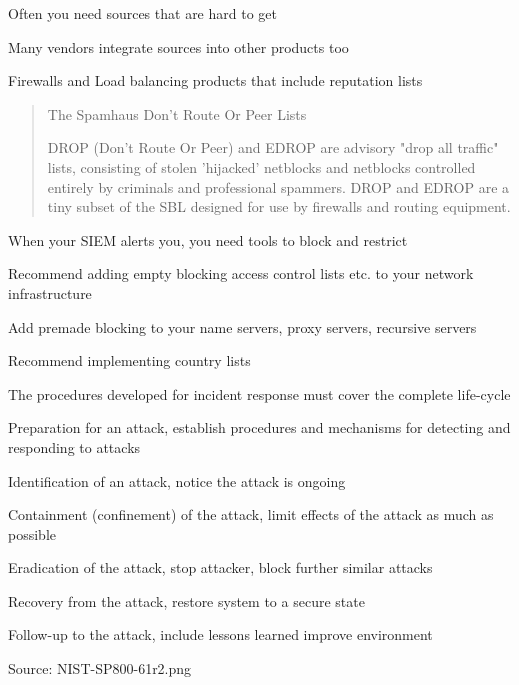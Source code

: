 \documentclass[Screen16to9,17pt]{foils}
\begin{document}
\begin{list2}
\item Often you need sources that are hard to get
\item Many vendors integrate sources into other products too
\item Firewalls and Load balancing products that include reputation lists
\end{list2}


\begin{quote}
The Spamhaus Don't Route Or Peer Lists

DROP (Don't Route Or Peer) and EDROP are advisory "drop all traffic" lists, consisting of stolen 'hijacked' netblocks and netblocks controlled entirely by criminals and professional spammers. DROP and EDROP are a tiny subset of the SBL designed for use by firewalls and routing equipment.
\end{quote}



\begin{list2}
\item When your SIEM alerts you, you need tools to block and restrict
\item Recommend adding empty blocking access control lists etc. to your network infrastructure
\item Add premade blocking to your name servers, proxy servers, recursive servers
\item Recommend implementing country lists
\end{list2}




The procedures developed for incident response must cover the complete life-cycle

\begin{list2}
\item  Preparation for an attack, establish procedures and mechanisms for detecting and responding to attacks
\item  Identification of an attack, notice the attack is ongoing
\item  Containment (confinement) of the attack, limit effects of the attack as much as possible
\item  Eradication of the attack, stop attacker, block further similar attacks
\item  Recovery from the attack, restore system to a secure state
\item  Follow-up to the attack, include lessons learned  improve environment
\end{list2}
Source: NIST-SP800-61r2.png
\end{document}
